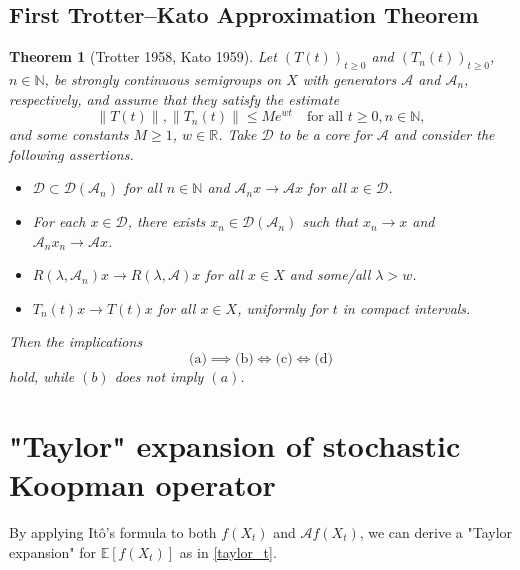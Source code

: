 \documentclass{article}[11]
\newtheorem{theorem}{Theorem}
\begin{document}
	
	\subsection*{First Trotter--Kato Approximation Theorem}
	\begin{theorem}[Trotter 1958, Kato 1959]\label{TK}
		Let $(T(t))_{t\geq0}$ and $(T_n(t))_{t\geq0}$, $n \in \mathbb{N}$, be strongly continuous semigroups on $X$ with generators $\mathcal{A}$ and $\mathcal{A}_n$, respectively, and assume that they satisfy the estimate
		\[
		\|T(t)\|, \|T_n(t)\| \leq Me^{wt} \quad \text{for all } t \geq 0, n \in \mathbb{N},
		\]
		and some constants $M \geq 1$, $w \in \mathbb{R}$. Take $\mathcal{D}$ to be a core for $\mathcal{A}$ and consider the following assertions.
		\begin{itemize}
			\item[(a)] $\mathcal{D} \subset \mathcal{D}(\mathcal{A}_n)$ for all $n \in \mathbb{N}$ and $\mathcal{A}_n x \to \mathcal{A} x$ for all $x \in \mathcal{D}$.
			\item[(b)] For each $x \in \mathcal{D}$, there exists $x_n \in \mathcal{D}(\mathcal{A}_n)$ such that $x_n \to x$ and $\mathcal{A}_n x_n \to \mathcal{A} x$.
			\item[(c)] $R(\lambda, \mathcal{A}_n)x \to R(\lambda, \mathcal{A})x$ for all $x \in X$ and some/all $\lambda > w$.
			\item[(d)] $T_n(t)x \to T(t)x$ for all $x \in X$, uniformly for $t$ in compact intervals.
		\end{itemize}
		Then the implications
		\[
		\text{(a)} \implies \text{(b)} \iff \text{(c)} \iff \text{(d)}
		\]
		hold, while $(b)$ does not imply $(a)$.
	\end{theorem}
	
	
	
	
	
	
	\appendix
	\newpage
	\section{"Taylor" expansion of stochastic Koopman operator}\label{expansion_Ito_formula}
	By applying It\^{o}'s formula to both \( f(X_t) \) and \( \mathcal{A} f(X_t) \), we can derive a "Taylor expansion" for \( \mathbb{E}[f(X_t)] \) as in \eqref{taylor_t}. 
	
\end{document}
